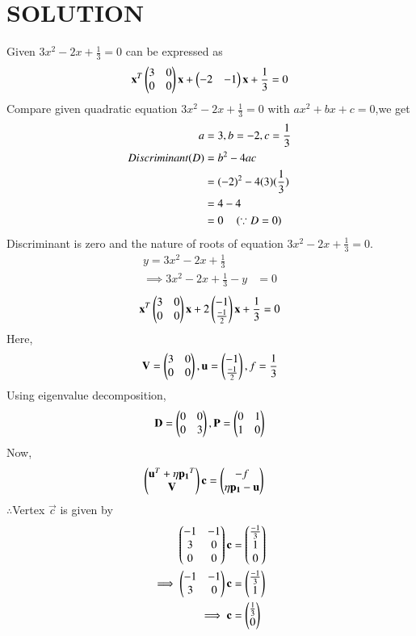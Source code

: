 \documentclass[journal,12pt,twocolumn]{IEEEtran}
\begin{document}
\section{SOLUTION}
Given
$3x^2 -2x + \frac{1}{3} = 0$ can be expressed as 
\begin{align}
\mathbf{x}^T \begin{pmatrix}3 & 0\\0 & 0\end{pmatrix}\mathbf{x}+ \begin{pmatrix}-2 & -1\end{pmatrix}\mathbf{x}+\frac{1}{3}=0
\end{align}
%
Compare given quadratic equation  $3x ^2 -2x +\frac{1}{3} = 0$ with $ax^2 + bx + c = 0$,we get
\begin{align}
a&=3,b=-2,c=\frac{1}{3}
\\
Discriminant(D) &= b^2 - 4ac
\\
&=(-2)^2-4(3)(\frac{1}{3})
\\
&=4-4
\\
&=0 \quad \left(\because D=0\right)
\end{align}
Discriminant is zero and the nature of roots of equation $3x^2 - 2x + \frac{1}{3} = 0$.
\begin{align}
y = 3x^2-2x+\frac{1}{3}\\
\implies 3x^2-2x+\frac{1}{3}-y &=0
\end{align}
\begin{align}
\mathbf{x}^T \begin{pmatrix}3 & 0\\0 & 0\end{pmatrix}\mathbf{x}+ 2\begin{pmatrix}-1 \\ \frac{-1}{2}\end{pmatrix}\mathbf{x}+\frac{1}{3}=0
\end{align}
Here,
\begin{align}
\mathbf{V} = \begin{pmatrix}3 & 0 \\ 0 & 0\end{pmatrix},\mathbf{u}=\begin{pmatrix}-1 \\ \frac{-1}{2}\end{pmatrix},f=\frac{1}{3}
\end{align}
Using eigenvalue decomposition,
\begin{align}
\mathbf{D} = \begin{pmatrix}0 & 0\\0 & 3\end{pmatrix} ,\mathbf{P}=\begin{pmatrix}0 & 1\\1 & 0\end{pmatrix}
\end{align}
Now,
\begin{align}
\begin{pmatrix}\mathbf{u}^T + \eta\mathbf{p_1}^T \\ \mathbf{V}\end{pmatrix}\mathbf{c} &= \begin{pmatrix}-f \\ \eta\mathbf{p_1}-\mathbf{u}\end{pmatrix} 
\end{align}
$\therefore$Vertex $\vec{c}$ is given by
\begin{align}
\begin{pmatrix}-1 & -1 \\ 3 & 0 \\ 0 & 0\end{pmatrix}\mathbf{c} &= \begin{pmatrix}\frac{-1}{3}\\ 1 \\ 0\end{pmatrix} \\
\implies  \begin{pmatrix}-1 & -1 \\ 3 & 0\end{pmatrix}\mathbf{c} &= \begin{pmatrix}\frac{-1}{3}\\ 1\end{pmatrix}
\\
\implies \mathbf{c} &= \begin{pmatrix}\frac{1}{3}\\0\end{pmatrix}
\end{align}
\end{document}
